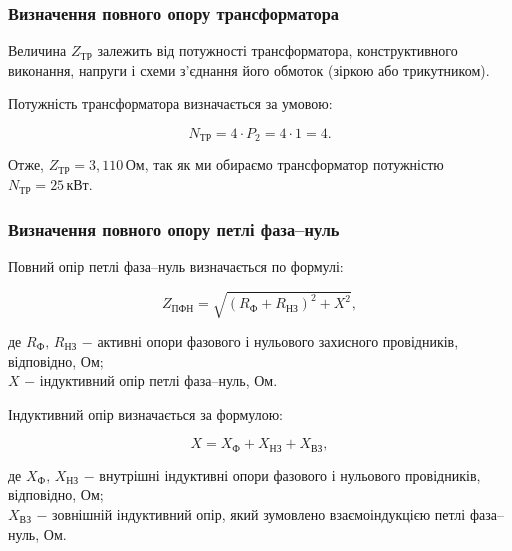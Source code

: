 \vspace{1.5em}

\subsubsection{Визначення повного опору трансформатора}

Величина $Z_{\text{ТР}}$ залежить від потужності трансформатора, конструктивного виконання, напруги і схеми з'єднання його обмоток (зіркою або трикутником).

Потужність трансформатора визначається за умовою:

\begin{equation}\label{eq:work5}
	N_{\text{ТР}} = 4 \cdot P_{2} = 4 \cdot 1 = 4.
\end{equation}

\vspace{1.5em}

Отже,  $Z_{\text{ТР}} = 3,110 \, \text{Ом}$,  так як  ми обираємо  трансформатор  потужністю $N_{\text{ТР}} = 25 \, \text{кВт}$.

\subsubsection{Визначення повного опору петлі фаза–нуль}

Повний опір петлі фаза–нуль визначається по формулі:

\begin{equation}\label{eq:work6}
	Z_{\text{ПФН}} = \sqrt{(R_{\text{Ф}} + R_{\text{НЗ}})^{2} + X^{2}},
\end{equation}

\noindent де $R_{\text{Ф}}, \, R_{\text{НЗ}}$ $-$ активні опори фазового і нульового захисного провідників, відповідно, Ом; \\
\hspace*{15pt} $X$ $-$  індуктивний опір петлі фаза–нуль, Ом. 

\vspace{1.5em}

Індуктивний опір визначається за формулою:

\begin{equation}\label{eq:work7}
	X = X_{\text{Ф}} + X_{\text{НЗ}} + X_{\text{ВЗ}},
\end{equation}

\noindent де $X_{\text{Ф}}, \, X_{\text{НЗ}}$ $-$ внутрішні індуктивні опори фазового і нульового провідників, відповідно, Ом; \\
\hspace*{15pt} $X_{\text{ВЗ}}$ $-$ зовнішній індуктивний опір, який зумовлено взаємоіндукцією петлі фаза–нуль, Ом.

